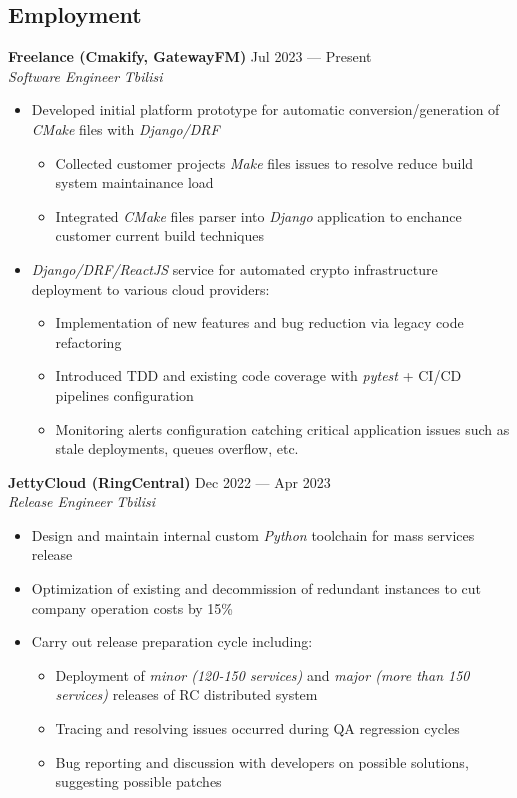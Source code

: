\documentclass[10pt]{report}
\newenvironment{JobDescription}[5]{
    \vspace{ #5 }
    \flushleft
    {\bf #1 } \hfill { #2 }
    \\
    {\em #3 } \hfill {\em #4 }
    \begin{itemize}
} {
    \end{itemize}
}
\begin{document}
\subsection*{Employment}
\begin{JobDescription}{Freelance (Cmakify, GatewayFM)}{Jul 2023 --- Present}{Software Engineer}{Tbilisi}{2mm}
    \item Developed initial platform prototype for automatic conversion/generation of \emph{CMake} files with
        \emph{Django/DRF}
    \begin{itemize}
        \item Collected customer projects \emph{Make} files issues to resolve reduce build system maintainance load
        \item Integrated \emph{CMake} files parser into \emph{Django} application to enchance customer current build techniques
    \end{itemize}
    \item \emph{Django/DRF/ReactJS} service for automated crypto infrastructure deployment to various cloud providers:
    \begin{itemize}
        \item Implementation of new features and bug reduction via legacy code refactoring
        \item Introduced TDD and existing code coverage with \emph{pytest} + CI/CD pipelines configuration
        \item Monitoring alerts configuration catching critical application issues such as stale deployments, queues
            overflow, etc.
    \end{itemize}
\end{JobDescription}

\begin{JobDescription}{JettyCloud (RingCentral)}{Dec 2022 --- Apr 2023}{Release Engineer}{Tbilisi}{2mm}
    \item Design and maintain internal custom \emph{Python} toolchain for mass services release
    \item Optimization of existing and decommission of redundant instances to cut company operation costs by 15\%
    \item Carry out release preparation cycle including:
    \begin{itemize}
        \item Deployment of \emph{minor (120-150 services)} and \emph{major (more than 150 services)} releases of RC distributed system
        \item Tracing and resolving issues occurred during QA regression cycles
        \item Bug reporting and discussion with developers on possible solutions, suggesting possible patches
    \end{itemize}
\end{JobDescription}
\end{document}
